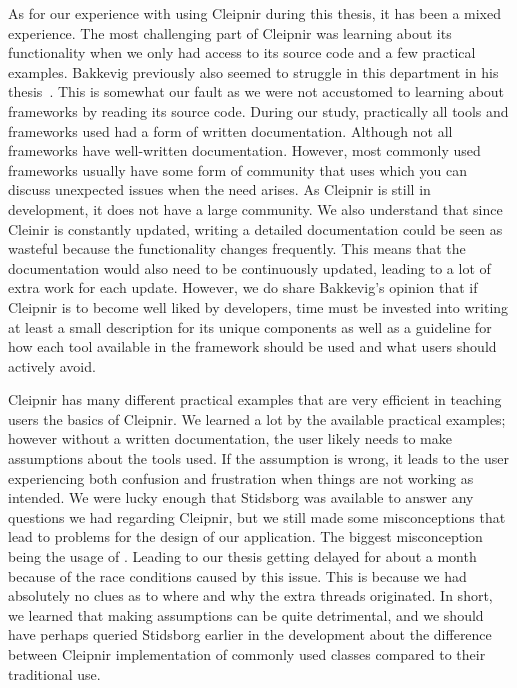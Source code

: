 As for our experience with using Cleipnir during this thesis, it has been a mixed experience. The most challenging part of Cleipnir was learning about its functionality when we only had access to its source code and a few practical examples. Bakkevig previously also seemed to struggle in this department in his thesis~\cite[p.~43-44]{PAPER:EivindPaper}. This is somewhat our fault as we were not accustomed to learning about frameworks by reading its source code. During our study, practically all tools and frameworks used had a form of written documentation. Although not all frameworks have well-written documentation. However, most commonly used frameworks usually have some form of community that uses which you can discuss unexpected issues when the need arises. As Cleipnir is still in development, it does not have a large community. We also understand that since Cleinir is constantly updated, writing a detailed documentation could be seen as wasteful because the functionality changes frequently. This means that the documentation would also need to be continuously updated, leading to a lot of extra work for each update. However, we do share Bakkevig’s opinion that if Cleipnir is to become well liked by developers, time must be invested into writing at least a small description for its unique components as well as a guideline for how each tool available in the framework should be used and what users should actively avoid. 

Cleipnir has many different practical examples that are very efficient in teaching users the basics of Cleipnir. We learned a lot by the available practical examples; however without a written documentation, the user likely needs to make assumptions about the tools used. If the assumption is wrong, it leads to the user experiencing both confusion and frustration when things are not working as intended. We were lucky enough that Stidsborg was available to answer any questions we had regarding Cleipnir, but we still made some misconceptions that lead to problems for the design of our application. The biggest misconception being the usage of . Leading to our thesis getting delayed for about a month because of the race conditions caused by this issue. This is because we had absolutely no clues as to where and why the extra threads originated.   In short, we learned that making assumptions can be quite detrimental, and we should have perhaps queried Stidsborg earlier in the development about the difference between Cleipnir implementation of commonly used classes compared to their traditional use. 
\fi
